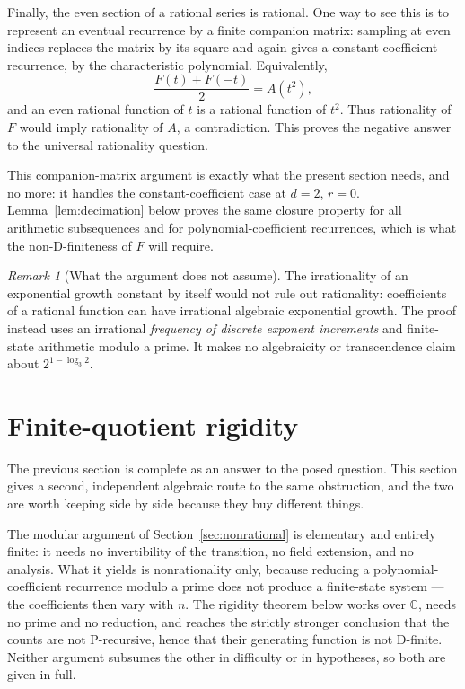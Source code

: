 \documentclass[11pt,letterpaper]{article}
\numberwithin{equation}{section}
\theoremstyle{definition}
\theoremstyle{remark}
\newtheorem{remark}[theorem]{Remark}
\newcommand{\C}{\mathbb{C}}
\begin{document}
Finally, the even section of a rational series is rational. One way to see
this is to represent an eventual recurrence by a finite companion matrix:
sampling at even indices replaces the matrix by its square and again gives
a constant-coefficient recurrence, by the characteristic polynomial.
Equivalently,
\[
 \frac{F(t)+F(-t)}2=A(t^2),
\]
and an even rational function of $t$ is a rational function of $t^2$.
Thus rationality of $F$ would imply rationality of $A$, a contradiction.
This proves the negative answer to the universal rationality question.

This companion-matrix argument is exactly what the present section needs,
and no more: it handles the constant-coefficient case at $d=2$, $r=0$.
Lemma~\ref{lem:decimation} below proves the same closure property for all
arithmetic subsequences and for polynomial-coefficient recurrences, which is
what the non-D-finiteness of $F$ will require.

\begin{remark}[What the argument does not assume]
The irrationality of an exponential growth constant by itself would not
rule out rationality: coefficients of a rational function can have
irrational algebraic exponential growth. The proof instead uses an
irrational \emph{frequency of discrete exponent increments} and finite-state
arithmetic modulo a prime. It makes no algebraicity or transcendence claim
about $2^{1-\log_3 2}$.
\end{remark}

\section{Finite-quotient rigidity}\label{sec:rigidity}

The previous section is complete as an answer to the posed question. This
section gives a second, independent algebraic route to the same obstruction,
and the two are worth keeping side by side because they buy different things.

The modular argument of Section~\ref{sec:nonrational} is elementary and
entirely finite: it needs no invertibility of the transition, no field
extension, and no analysis. What it yields is nonrationality only, because
reducing a polynomial-coefficient recurrence modulo a prime does not produce
a finite-state system --- the coefficients then vary with $n$. The rigidity
theorem below works over $\C$, needs no prime and no reduction, and reaches
the strictly stronger conclusion that the counts are not P-recursive, hence
that their generating function is not D-finite. Neither argument subsumes
the other in difficulty or in hypotheses, so both are given in full.
\end{document}
